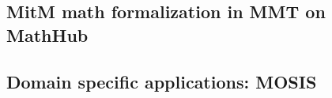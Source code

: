 \subsection{MitM math formalization in MMT on MathHub}
\subsection{Domain specific applications: MOSIS}


